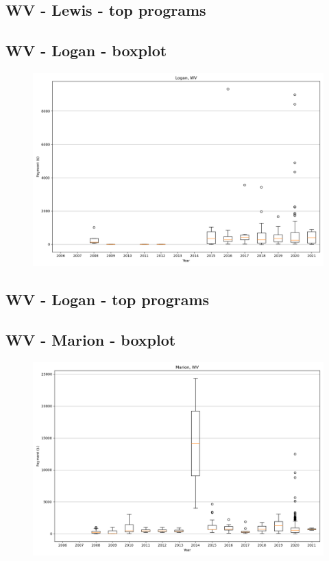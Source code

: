 \subsection*{WV - Lewis - top programs}

\newpage
\subsection*{WV - Logan - boxplot}
\begin{figure}[h]
\centering
\includegraphics[width=7in]{../output/boxplots/counties/Logan-WV_boxplot.png}
\end{figure}


\subsection*{WV - Logan - top programs}

\newpage
\subsection*{WV - Marion - boxplot}
\begin{figure}[h]
\centering
\includegraphics[width=7in]{../output/boxplots/counties/Marion-WV_boxplot.png}
\end{figure}


